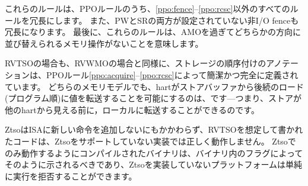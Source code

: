 \begin{commentary}
  \begin{comment}
  These rules render all PPO rules except \ref{ppo:fence}--\ref{ppo:rcsc} redundant.
  They also make redundant any non-I/O fences that do not have both PW and SR set.
  Finally, they also imply that no memory operation will be reordered past an AMO in either direction.

  In the context of RVTSO, as is the case for RVWMO, the storage ordering annotations are concisely and completely defined by PPO rules \ref{ppo:acquire}--\ref{ppo:rcsc}. In both of these memory models, it is the \nameref{rvwmo:ax:load} that allows a hart to forward a value from its store buffer to a subsequent (in program order) load---that is to say that stores can be forwarded locally before they are visible to other harts.
  \end{comment}

  これらのルールは、PPOルールのうち、\ref{ppo:fence}--\ref{ppo:rcsc}以外のすべてのルールを冗長にします。
  また、PWとSRの両方が設定されていない非I/O fenceも冗長になります。
  最後に、これらのルールは、AMOを過ぎてどちらかの方向に並び替えられるメモリ操作がないことを意味します。

  RVTSOの場合も、RVWMOの場合と同様に、ストレージの順序付けのアノテーションは、PPOルール\ref{ppo:acquire}--\ref{ppo:rcsc}によって簡潔かつ完全に定義されています。
  どちらのメモリモデルでも、hartがストアバッファから後続のロード(プログラム順)に値を転送することを可能にするのは、です---つまり、ストアが他のhartから見える前に，ローカルに転送することができるのです。


\end{commentary}

\begin{comment}
In spite of the fact that Ztso adds no new instructions to the ISA, code written assuming RVTSO will not run correctly on implementations not supporting Ztso.
Binaries compiled to run only under Ztso should indicate as such via a flag in the binary, so that platforms which do not implement Ztso can simply refuse to run them.
\end{comment}

ZtsoはISAに新しい命令を追加しないにもかかわらず、RVTSOを想定して書かれたコードは、Ztsoをサポートしていない実装では正しく動作しません。
Ztsoでのみ動作するようにコンパイルされたバイナリは、バイナリ内のフラグによってそのように示されるべきであり、Ztsoを実装していないプラットフォームは単純に実行を拒否することができます。
